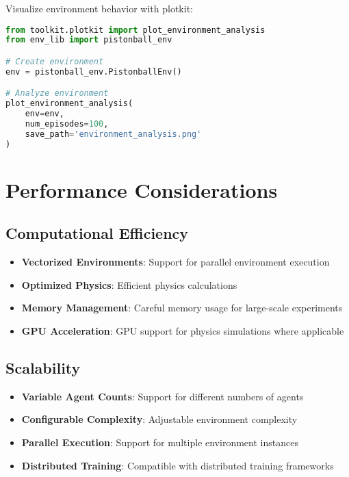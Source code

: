 Visualize environment behavior with plotkit:

\begin{lstlisting}[language=python, caption=Plotting Integration]
from toolkit.plotkit import plot_environment_analysis
from env_lib import pistonball_env

# Create environment
env = pistonball_env.PistonballEnv()

# Analyze environment
plot_environment_analysis(
    env=env,
    num_episodes=100,
    save_path='environment_analysis.png'
)
\end{lstlisting}

\section{Performance Considerations}

\subsection{Computational Efficiency}

\begin{itemize}
    \item \textbf{Vectorized Environments}: Support for parallel environment execution
    \item \textbf{Optimized Physics}: Efficient physics calculations
    \item \textbf{Memory Management}: Careful memory usage for large-scale experiments
    \item \textbf{GPU Acceleration}: GPU support for physics simulations where applicable
\end{itemize}

\subsection{Scalability}

\begin{itemize}
    \item \textbf{Variable Agent Counts}: Support for different numbers of agents
    \item \textbf{Configurable Complexity}: Adjustable environment complexity
    \item \textbf{Parallel Execution}: Support for multiple environment instances
    \item \textbf{Distributed Training}: Compatible with distributed training frameworks
\end{itemize}


